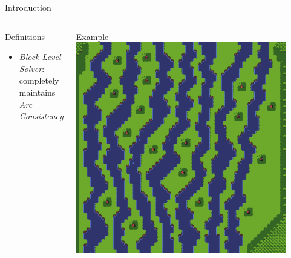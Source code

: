 \documentclass{beamer}
\begin{document}
  \begin{frame}[fragile]{Introduction}
    \begin{columns}[T,onlytextwidth]
        \begin{block}{Definitions}
          \hfill \\
          \begin{itemize}
            \item \textit{Block Level Solver}: \\
              completely maintains \textit{Arc Consistency}
          \end{itemize}
        \end{block}
        \begin{block}{Example}
          \includegraphics[width=0.9\textwidth]{img/forestmicro_64x64.pdf}
        \end{block}
    \end{columns}
  \end{frame}
\end{document}

